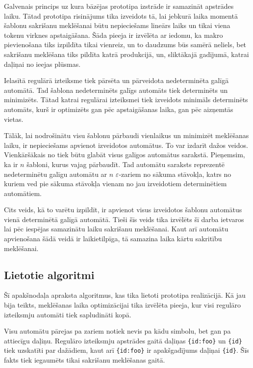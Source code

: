 Galvenais princips uz kura bāzējas prototipa izstrāde ir samazināt apstrādes laiku. Tātad prototipa risinājums tika izveidots tā, lai jebkurā laika momentā šablonu sakrišanu meklēšanai būtu nepieciešams lineārs laiks un tikai viena tokenu virknes apstaigāšana. Šāda pieeja ir izvēlēta ar iedomu, ka makro pievienošana tiks izpildīta tikai vienreiz, un to daudzums būs samērā neliels, bet sakrišanu meklēšana tiks pildīta katrā produkcijā, un, sliktākajā gadījumā, katrai daļiņai no ieejas plūsmas.

Ielasītā regulārā izteiksme tiek pārsēta un pārveidota nedeterminēta galīgā automātā. Tad šablona nedeterminēts galīgs automāts tiek determinēts un minimizēts. Tātad katrai regulārai izteiksmei tiek izveidots minimāls determinēts automāts, kurš ir optimizēts gan pēc apstaigāšanas laika, gan pēc aizņemtās vietas.

Tālāk, lai nodrošinātu visu šablonu pārbaudi vienlaikus un minimizēt meklēšanas laiku, ir nepieciešams apvienot izveidotos automātus. To var izdarīt dažos veidos. Vienkāršākais no tiek būtu glabāt visus galīgos automātus sarakstā. Pieņemsim, ka ir $n$ šabloni, kurus vajag pārbaudīt. Tad automātu saraksts reprezentē nedeterminētu galīgu automātu ar $n$ $\varepsilon$-zariem no sākuma stāvokļa, katrs no kuriem ved pie sākuma stāvokļa vienam no jau izveidotiem determinētiem automātiem.

Cits veids, kā to varētu izpildīt, ir apvienot visus izveidotos šablonu automātus vienā determinētā galīgā automātā. Tieši šīs veids tika izvēlēts šī darba ietvaros lai pēc iespējas samazinātu laiku sakrišanu meklēšanai. Kaut arī automātu apvienošana šādā veidā ir laikietilpīga, tā samazina laika kārtu sakritību meklēšanai.

\subsection{\label{sbs:prot_algorithms}Lietotie algoritmi}

Šī apakšnodaļa apraksta algoritmus, kas tika lietoti prototipa realizācijā. Kā jau bija teikts, meklēšanas laika optimizācijai tika izvēlēta pieeja, kur visi regulāro izteiksmju automāti tiek sapludināti kopā.

Visu automātu pārejas pa zariem notiek nevis pa kādu simbolu, bet gan pa attiecīgu daļiņu. Regulāro izteiksmju apstrādes gaitā daļiņas \verb|{id:foo}| un \verb|{id}| tiek uzskatīti par dažādiem, kaut arī \verb|{id:foo}| ir apakšgadījums daļiņai \verb|{id}|. Šīs fakts tiek iegaumēts tikai sakrišanu meklēšanas gaitā.

